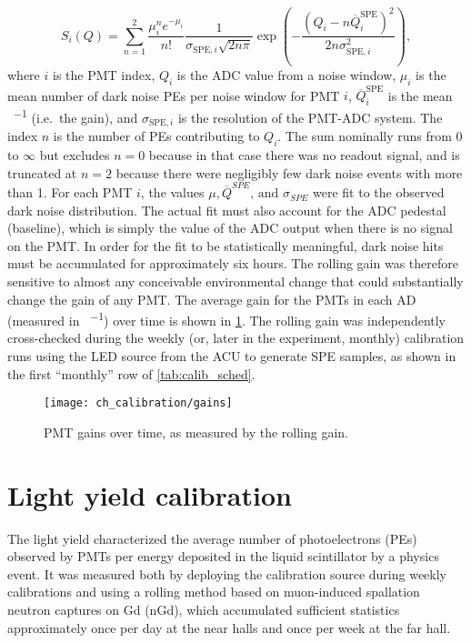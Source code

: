 \begin{equation}
    S_i(Q) = \sum_{n=1}^2 \frac{\mu_i^n e^{-\mu_i}}{n!}
    \frac{1}{\sigma_{\text{SPE},i}\sqrt{2n\pi}}
    \exp
    \left(
        -\frac{(Q_i-n\overline{Q}_i^{\text{SPE}})^2}{2n\sigma^2_{\text{SPE},i}}
    \right),
\end{equation}
where $i$ is the PMT index,
$Q_i$ is the ADC value from a noise window,
$\mu_i$ is the mean number of dark noise PEs per noise window for PMT $i$,
$\overline{Q}_i^{\text{SPE}}$ is the mean \si{\adc\per\pe} (i.e.\ the gain),
and $\sigma_{\text{SPE},i}$ is the resolution of the PMT-ADC system.
The index $n$ is the number of PEs contributing to $Q_i$.
The sum nominally runs from $0$ to $\infty$ but
excludes $n=0$ because in that case there was no readout signal,
and is truncated at $n=2$ because there were negligibly few dark noise events
with more than \SI{1}{\pe}.
For each PMT $i$, the values $\mu,\overline{Q}^{SPE}\text{, and }\sigma_{SPE}$ were fit
to the observed dark noise distribution.
The actual fit must also account for the ADC pedestal (baseline),
which is simply the value of the ADC output when there is no signal on the PMT.
In order for the fit to be statistically meaningful, dark noise hits must be accumulated
for approximately six hours.
The rolling gain was therefore sensitive to almost any conceivable
environmental change that could substantially change the gain of any PMT.
The average gain for the PMTs in each AD (measured in \si{\adc\per\pe})
over time is shown in \cref{fig:gain}.
The rolling gain was independently cross-checked during the weekly
(or, later in the experiment, monthly) calibration runs
using the LED source from the ACU to generate SPE samples,
as shown in the first ``monthly'' row of \cref{tab:calib_sched}.

\begin{figure}
    \centering
    \texttt{[image: ch\_calibration/gains]}
    \caption[PMT gains over time]{PMT gains over time, as measured by the rolling gain.}
    \label{fig:gain}
\end{figure}


\section{Light yield calibration}
\label{sec:light_yield_calib}

The light yield characterized the average
number of photoelectrons (PEs) observed by PMTs
per energy deposited in the liquid scintillator
by a physics event.
It was measured both by deploying the  calibration source
during weekly calibrations
and using a rolling method based on muon-induced spallation neutron
captures on Gd (nGd), which accumulated sufficient statistics
approximately once per day at the near halls and once per week at the far hall.

